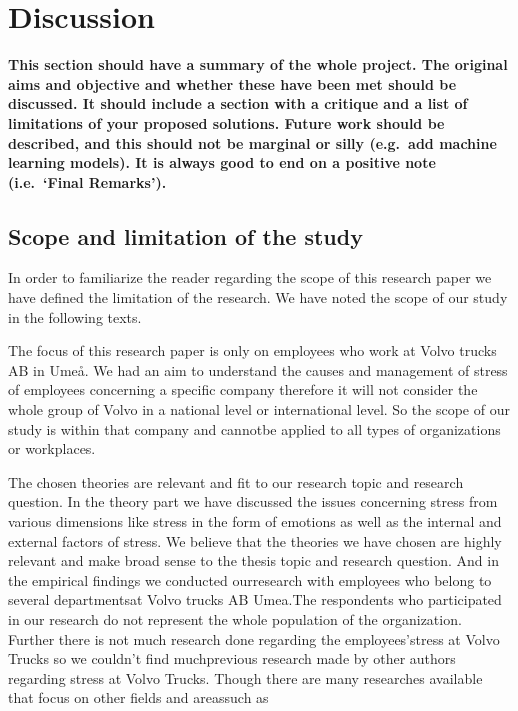 \chapter{Discussion}
\textbf{This section should have a summary of the whole project.  The original aims and objective and whether these have been met should be discussed. It should include a section with a critique and a list of limitations of your proposed solutions.  Future work should be described, and this should not be marginal or silly (e.g.\ add machine learning models).  It is always good to end on a positive note (i.e.\ `Final Remarks').}


\section{Scope and limitation of the study}
In order to  familiarize the reader  regarding the scope of this research paper we have defined the limitation of the research. We have noted the scope of our study in the following texts.

The focus of this research paper is only on employees who work at Volvo trucks AB in Umeå. We had an aim to understand the causes and management of stress of employees concerning a specific company therefore it will not consider the whole group of Volvo in a national level or international level. So the scope of our study is within that company and cannotbe applied to all types of organizations or workplaces.

The  chosen  theories  are  relevant  and  fit  to  our  research  topic  and  research  question.  In  the theory part we have discussed the issues concerning stress from various dimensions like stress in the form of emotions as well as the internal and external factors of stress. We believe that the theories we have chosen are highly relevant and make broad sense to the thesis topic and research  question.  And  in  the  empirical  findings  we  conducted  ourresearch  with  employees who  belong  to  several  departmentsat  Volvo  trucks  AB  Umea.The  respondents  who participated in our research do not represent the whole population of the organization. Further there  is  not  much  research  done  regarding  the  employees’stress  at Volvo  Trucks so  we couldn’t find muchprevious research made by other authors regarding stress at Volvo Trucks. Though  there  are  many  researches  available  that  focus  on  other  fields  and  areassuch  as


